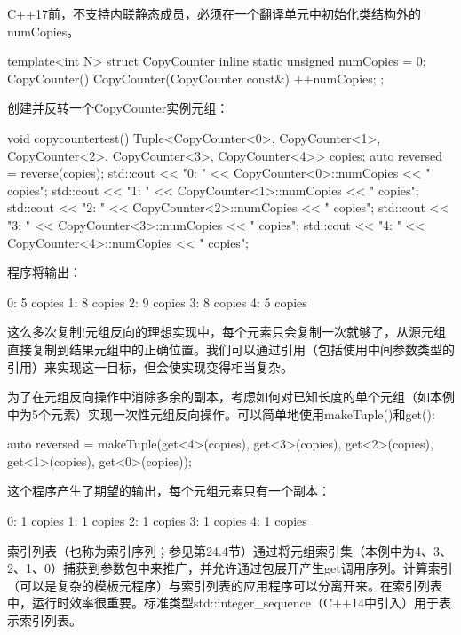 \begin{notice}
C++17前，不支持内联静态成员，必须在一个翻译单元中初始化类结构外的numCopies。
\end{notice}

\begin{cpp}
template<int N>
struct CopyCounter
{
	inline static unsigned numCopies = 0;
	CopyCounter() {
	}
	CopyCounter(CopyCounter const&) {
		++numCopies;
	}
};
\end{cpp}

创建并反转一个CopyCounter实例元组：

\begin{cpp}
void copycountertest() {
	Tuple<CopyCounter<0>, CopyCounter<1>, CopyCounter<2>,
			CopyCounter<3>, CopyCounter<4>> copies;
	auto reversed = reverse(copies);
	std::cout << "0: " << CopyCounter<0>::numCopies << " copies\n";
	std::cout << "1: " << CopyCounter<1>::numCopies << " copies\n";
	std::cout << "2: " << CopyCounter<2>::numCopies << " copies\n";
	std::cout << "3: " << CopyCounter<3>::numCopies << " copies\n";
	std::cout << "4: " << CopyCounter<4>::numCopies << " copies\n";
}
\end{cpp}

程序将输出：

\begin{shell}
0: 5 copies
1: 8 copies
2: 9 copies
3: 8 copies
4: 5 copies
\end{shell}

这么多次复制!元组反向的理想实现中，每个元素只会复制一次就够了，从源元组直接复制到结果元组中的正确位置。我们可以通过引用（包括使用中间参数类型的引用）来实现这一目标，但会使实现变得相当复杂。

为了在元组反向操作中消除多余的副本，考虑如何对已知长度的单个元组（如本例中为5个元素）实现一次性元组反向操作。可以简单地使用makeTuple()和get():

\begin{cpp}
auto reversed = makeTuple(get<4>(copies), get<3>(copies),
							get<2>(copies), get<1>(copies),
							get<0>(copies));
\end{cpp}

这个程序产生了期望的输出，每个元组元素只有一个副本：

\begin{shell}
0: 1 copies
1: 1 copies
2: 1 copies
3: 1 copies
4: 1 copies
\end{shell}

索引列表（也称为索引序列；参见第24.4节）通过将元组索引集（本例中为4、3、2、1、0）捕获到参数包中来推广，并允许通过包展开产生get调用序列。计算索引（可以是复杂的模板元程序）与索引列表的应用程序可以分离开来。在索引列表中，运行时效率很重要。标准类型std::integer\_sequence（C++14中引入）用于表示索引列表。

